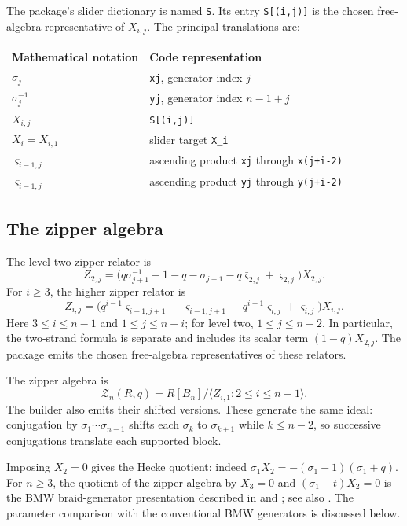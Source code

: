 \documentclass[11pt]{article}
\begin{document}
The package's slider dictionary is named \texttt{S}. Its entry
\texttt{S[(i,j)]} is the chosen free-algebra representative of $X_{i,j}$.
The principal translations are:
\begin{center}
\begin{tabular}{ll}
Mathematical notation & Code representation \\
\hline
$\sigma_j$ & \texttt{xj}, generator index $j$ \\
$\sigma_j^{-1}$ & \texttt{yj}, generator index $n-1+j$ \\
$X_{i,j}$ & \texttt{S[(i,j)]} \\
$X_i=X_{i,1}$ & slider target \texttt{X\_i} \\
$\varsigma_{i-1,j}$ & ascending product \texttt{xj} through \texttt{x(j+i-2)} \\
$\bar{\varsigma}_{i-1,j}$ & ascending product \texttt{yj} through \texttt{y(j+i-2)}
\end{tabular}
\end{center}

\subsection{The zipper algebra}
The level-two zipper relator is
\[
 Z_{2,j}=\bigl(q\sigma_{j+1}^{-1}+1-q-\sigma_{j+1}
             -q\bar{\varsigma}_{2,j}+\varsigma_{2,j}\bigr)X_{2,j}.
\]
For $i\ge3$, the higher zipper relator is
\[
 Z_{i,j}=\bigl(q^{i-1}\bar{\varsigma}_{i-1,j+1}-\varsigma_{i-1,j+1}
             -q^{i-1}\bar{\varsigma}_{i,j}+\varsigma_{i,j}\bigr)X_{i,j}.
\]
Here $3\le i\le n-1$ and $1\le j\le n-i$; for level two,
$1\le j\le n-2$. In particular, the two-strand formula is separate and includes
its scalar term $(1-q)X_{2,j}$. The package emits the chosen free-algebra
representatives of these relators.

The zipper algebra is
\[
 \mathcal Z_n(R,q)=R[B_n]/\langle Z_{i,1}:2\le i\le n-1\rangle.
\]
The builder also emits their shifted versions. These generate the same ideal:
conjugation by $\sigma_1\cdots\sigma_{n-1}$ shifts each $\sigma_k$ to
$\sigma_{k+1}$ while $k\le n-2$, so successive conjugations translate each
supported block.

Imposing $X_2=0$ gives the Hecke quotient: indeed
$\sigma_1X_2=-(\sigma_1-1)(\sigma_1+q)$.
For $n\ge3$, the quotient of the zipper algebra by $X_3=0$ and
$(\sigma_1-t)X_2=0$ is the BMW braid-generator presentation described in
\cite[\S8]{bigelow} and \cite[\S3.2]{thesis}; see also \cite{birmanwenzl,murakami}.
The parameter comparison with the conventional BMW generators is discussed
below.
\end{document}
